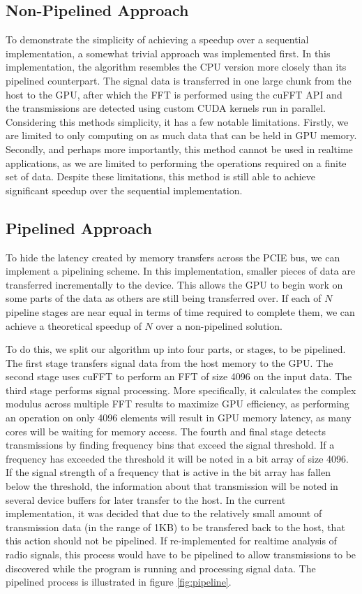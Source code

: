 \documentclass[conference]{IEEEtran}
\begin{document}
\subsection{Non-Pipelined Approach}

To demonstrate the simplicity of achieving a speedup over a sequential implementation,
a somewhat trivial approach was implemented first. In this implementation, the algorithm
resembles the CPU version more closely than its pipelined counterpart. The signal data
is transferred in one large chunk from the host to the GPU, after which the FFT
is performed using the cuFFT API and the transmissions are detected using custom
CUDA kernels run in parallel. Considering this methods simplicity, it has a few notable
limitations. Firstly, we are limited to only computing on as much data that can be
held in GPU memory. Secondly, and perhaps more importantly, this method cannot be used
in realtime applications, as we are limited to performing the operations required
on a finite set of data. Despite these limitations, this method is still able to 
achieve significant speedup over the sequential implementation.

\subsection{Pipelined Approach}

To hide the latency created by memory transfers across the PCIE bus, we can implement
a pipelining scheme. In this implementation, smaller pieces of data are transferred
incrementally to the device. This allows the GPU to begin work on some parts of 
the data as others are still being transferred over. If each of $N$ pipeline stages are
near equal in terms of time required to complete them, we can achieve a theoretical
speedup of $N$ over a non-pipelined solution. 

To do this, we split our algorithm up into four parts, or stages, to be pipelined.
The first stage transfers signal data from the host memory to the GPU. The second 
stage uses cuFFT to perform an FFT of size 4096 on the input data. The third stage performs
signal processing. More specifically, it calculates the complex modulus across
multiple FFT results to maximize GPU efficiency, as performing an operation on only
4096 elements will result in GPU memory latency, as many cores will be waiting for
memory access. The fourth and final stage detects transmissions by finding frequency
bins that exceed the signal threshold. If a frequency has exceeded the threshold it
will be noted in a bit array of size 4096. If the signal strength of a frequency that 
is active in the bit array has fallen below the threshold, the information about that
transmission will be noted in several device buffers for later transfer to the host.
In the current implementation, it was decided that due to the relatively small amount
of transmission data (in the range of 1KB) to be transfered back to the host, that
this action should not be pipelined. If re-implemented for realtime analysis of radio
signals, this process would have to be pipelined to allow transmissions to be
discovered while the program is running and processing signal data. The pipelined
process is illustrated in figure \ref{fig:pipeline}. 
\end{document}
